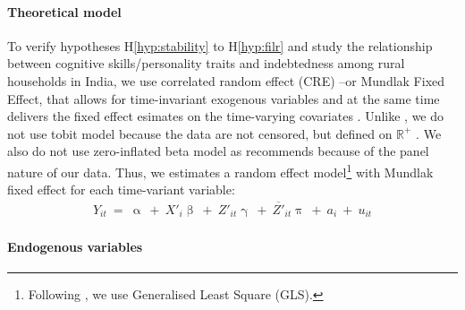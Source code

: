 \documentclass[a4paper, 11pt, onecolumn]{article}
\begin{document}

\paragraph*{Theoretical model}
To verify hypotheses H\ref{hyp:stability} to H\ref{hyp:filr} and study the relationship between cognitive skills/personality traits and indebtedness among rural households in India, we use correlated random effect (CRE) --or Mundlak Fixed Effect, that allows for time-invariant exogenous variables and at the same time delivers the fixed effect esimates on the time-varying covariates \citep{Mundlak1978, Wooldridge2010, Wooldridge2013, Schunck2013}.
Unlike \cite{Brown2014}, we do not use tobit model because the data are not censored, but defined on $\mathbb{R}^{+}$ \citep{Maddala1991}.
We also do not use zero-inflated beta model as \cite{Cook2008} recommends because of the panel nature of our data.
Thus, we estimates a random effect model\footnote{Following \cite{Schunck2013, Wooldridge2013}, we use Generalised Least Square (GLS).} with Mundlak fixed effect for each time-variant variable:
\begin{equation}\label{eq:CRE}
\begin{split}
Y_{it}~=~\upalpha~+~X'_i\upbeta~+~Z'_{it}\upgamma~+~\overline{Z'}_{it}\uppi~+~a_i~+~u_{it}
\end{split}
\end{equation}

\paragraph*{Endogenous variables}
\end{document}
